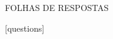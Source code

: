 \documentclass[a4paper,addpoints,answers,8pt]{exam}
\begin{document}
 




\small 

\begin{questions}

\begin{multicols}{2}

\end{multicols}



\end{questions}

\newpage
\begin{center}
  FOLHAS DE RESPOSTAS\\
\hfill \break


  \setlength{\doublerulesep}{0.25in}
  [questions]

%   

\end{center}
\end{document}
